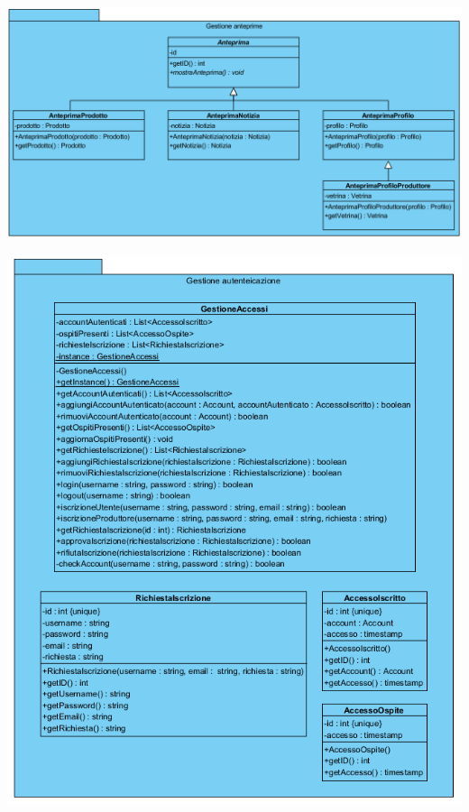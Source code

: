 \begin{center}
			\includegraphics[width=\textwidth]{assets/visualParadigm/classi/GestioneAnteprime}
\end{center}

\begin{center}
			\includegraphics[width=\textwidth]{assets/visualParadigm/classi/GestioneAutenticazione}
\end{center}

